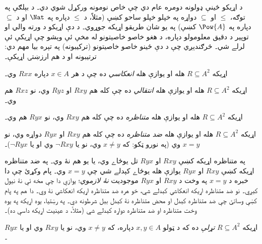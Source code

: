 \documentclass[../../../include/open-logic-section]{subfiles}
\begin{document}

\begin{intro}
د اړيکو ځينې ډولونه دومره عام دي چې خاص نومونه ورکړل شوي دي۔
د بېلګې په توګه، $\le$ او $\subseteq$ دواړه په خپلو خپلو ساحو کښې
(مثلاً، د $\le$ دپاره په $\Nat$ او د $\subseteq$ دپاره په $\Pow{A}$
کښې) په يو شان طريقو اړيکه جوړوي۔ د دې اړيکو د ورته والي او توپير
د دقيق معلومولو دپاره، د هغو خاصو خاصيتونو له مخې ئې وېشو چې
اړيکې ئې لرلے شي۔ څرګندېږي چې د دې ځينو خاصو خاصيتونو (ترکيبونه)
په تېره بيا مهم دي: ترتيبونه او د هم ارزښتۍ اړيکې۔
\end{intro}

\begin{defn}[انعکاس]
اړيکه $R \subseteq A^2$ هله او يوازې هله \emph{انعکاسي} ده چې
د هر $x \in A$ دپاره $Rxx$ وي۔
\end{defn}

\begin{defn}[انتقال]
اړيکه $R \subseteq A^2$ هله او يوازې هله \emph{انتقالي} ده چې
کله هم $Rxy$ او $Ryz$ وي، نو $Rxz$ هم وي۔
\end{defn}

\begin{defn}[تناظر]
اړيکه $R \subseteq A^2$ هله او يوازې هله \emph{متناظره} ده چې
کله هم $Rxy$ وي، نو $Ryx$ هم وي۔
\end{defn}

\begin{defn}[ضد تناظر]
اړيکه $R \subseteq A^2$ هله او يوازې هله \emph{ضد متناظره} ده چې
کله هم $Rxy$ او $Ryx$ دواړه وي، نو $x=y$ وي (په نورو ټکو: که
$x\neq y$ وي، نو يا $\lnot Rxy$ وي او يا $\lnot Ryx$)۔
\end{defn}

\begin{explain}
په متناظره اړيکه کښې $Rxy$ او $Ryx$ تل يوځاے وي، يا يو هم نۀ وي۔
په ضد متناظره اړيکه کښې $Rxy$ او $Ryx$ يوازې هله يوځاے کېدلے شي
چې $x = y$ وي۔ پام وکړئ چې دا خبره د $x = y$ په وخت د $Rxy$ او
$Ryx$ موجوديت \emph{نۀ لازموي}؛ يوازې دا چې مخه ئې نۀ نيول کېږي۔
نو ضد متناظره اړيکه انعکاسي کېدلے شي، خو هره ضد متناظره اړيکه
انعکاسي نۀ وي۔ دا هم په پام کښې وساتئ چې ضد متناظره کېدل او محض
متناظره نۀ کېدل بېل شرطونه دي۔ په رښتيا، يوه اړيکه په يوه وخت
متناظره او ضد متناظره دواړه کېدلے شي (مثلاً، د عينيت اړيکه داسې ده)۔
\end{explain}

\begin{defn}[تړلتيا]
اړيکه $R \subseteq A^2$ \emph{تړلې} ده که د ټولو $x,y\in A$
دپاره، که $x \neq y$ وي، نو يا $Rxy$ وي او يا $Ryx$۔
\end{defn}
\end{document}
